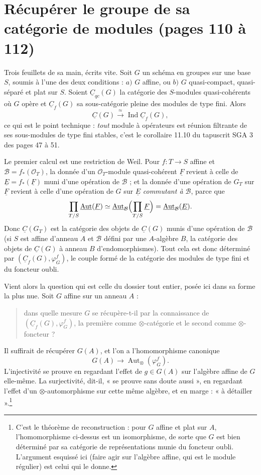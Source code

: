 \documentclass[11pt,a4paper]{article}
\begin{document}
\section*{Récupérer le groupe de sa catégorie de modules (pages 110 à 112)}

Trois feuillets de sa main, écrits vite. Soit $G$ un schéma en groupes sur une
base $S$, soumis à l'une des deux conditions : $a)$ $G$ affine, ou $b)$ $G$
quasi-compact, quasi-séparé et plat sur $S$. Soient
$\underline{C}_{qc}(G)$ la catégorie des $S$-modules quasi-cohérents où $G$
opère et $\underline{C}_{f}(G)$ sa sous-catégorie pleine des modules de type
fini. Alors
\[
\underline{C}(G) \xrightarrow{\ \approx\ }
\operatorname{Ind}\underline{C}_{f}(G) ,
\]
ce qui est le point technique : \emph{tout} module à opérateurs est réunion
filtrante de ses sous-modules de type fini stables, c'est le corollaire
11.10 du tapuscrit SGA 3 des pages 47 à 51.

Le premier calcul est une restriction de Weil. Pour $f \colon T \to S$ affine et
$\mathcal{B} = f_{*}(\mathcal{O}_{T})$, la donnée d'un
$\mathcal{O}_{T}$-module quasi-cohérent $\underline{F}$ revient à celle de
$\underline{E} = f_{*}(\underline{F})$ muni d'une opération de $\mathcal{B}$ ;
et la donnée d'une opération de $G_{T}$ sur $\underline{F}$ revient à celle
d'une opération de $G$ sur $\underline{E}$ \emph{commutant à $\mathcal{B}$},
parce que
\[
\prod_{T/S}\underline{\operatorname{Aut}}(\underline{F})
\simeq \underline{\operatorname{Aut}}_{\mathcal{B}}
\Bigl( \prod_{T/S}\underline{F} \Bigr)
= \underline{\operatorname{Aut}}_{\mathcal{B}}(\underline{E}) .
\]
Donc $\underline{C}(G_{T})$ est la catégorie des objets de
$\underline{C}(G)$ munis d'une opération de $\mathcal{B}$ (si $S$ est affine
d'anneau $A$ et $\mathcal{B}$ défini par une $A$-algèbre $B$, la catégorie des
objets de $\underline{C}(G)$ à anneau $B$ d'endomorphismes). Tout cela est donc
déterminé par $(\underline{C}_{f}(G), \varphi_{G}^{f})$, le couple formé de la
catégorie des modules de type fini et du foncteur oubli.

Vient alors la question qui est celle du dossier tout entier, posée ici dans sa
forme la plus nue. Soit $G$ affine sur un anneau $A$ :
\begin{quote}
dans quelle mesure $G$ se récupère-t-il par la connaissance de
$(\underline{C}_{f}(G), \varphi_{G}^{f})$, la première comme
$\otimes$-catégorie et le second comme $\otimes$-foncteur ?
\end{quote}
Il suffirait de récupérer $G(A)$, et l'on a l'homomorphisme canonique
\[
G(A) \longrightarrow \operatorname{Aut}_{\otimes}(\varphi_{G}^{f}) .
\]
L'injectivité se prouve en regardant l'effet de $g \in G(A)$ sur l'algèbre
affine de $G$ elle-même. La surjectivité, dit-il, « se prouve sans doute
aussi », en regardant l'effet d'un $\otimes$-automorphisme sur cette même
algèbre, et en marge : « à détailler ».\footnote{C'est le théorème de
reconstruction : pour $G$ affine et plat sur $A$, l'homomorphisme ci-dessus est
un isomorphisme, de sorte que $G$ est bien déterminé par sa catégorie de
représentations munie du foncteur oubli. L'argument esquissé ici (faire agir
sur l'algèbre affine, qui est le module régulier) est celui qui le donne.}
\end{document}
